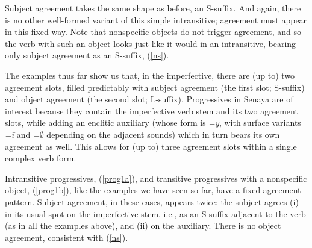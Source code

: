 \documentclass[output=paper
,modfonts
,nonflat]{langsci/langscibook}
\begin{document}
\eal \label{sleep}
\zl

\noindent Subject agreement takes the same shape as before, an S-suffix. And again, there is no other well-formed variant of this simple intransitive; agreement must appear in this fixed way. Note that nonspecific objects do not trigger agreement, and so the verb with such an object looks just like it would in an intransitive, bearing only subject agreement as an S-suffix, (\ref{ns}).

\eal \label{ns}
\zl
The examples thus far show us that, in the imperfective, there are (up to) two agreement slots, filled predictably with subject agreement (the first slot; S-suffix) and object agreement (the second slot; L-suffix). Progressives in Senaya are of interest because they contain the imperfective verb stem and its two agreement slots, while adding an enclitic auxiliary (whose form is \textit{=y}, with surface variants \textit{=\=i} and \textit{=$\emptyset$} depending on the adjacent sounds) which in turn bears its own agreement as well. This allows for (up to) three agreement slots within a single complex verb form.

Intransitive progressives, (\ref{prog1a}), and transitive progressives with a nonspecific object, (\ref{prog1b}), like the examples we have seen so far, have a fixed agreement pattern. Subject agreement, in these cases, appears twice: the subject agrees (i) in its usual spot on the imperfective stem, i.e., as an S-suffix adjacent to the verb (as in all the examples above), and (ii) on the auxiliary. There is no object agreement, consistent with (\ref{ns}).

\eal \label{prog1}
\zl
\end{document}
